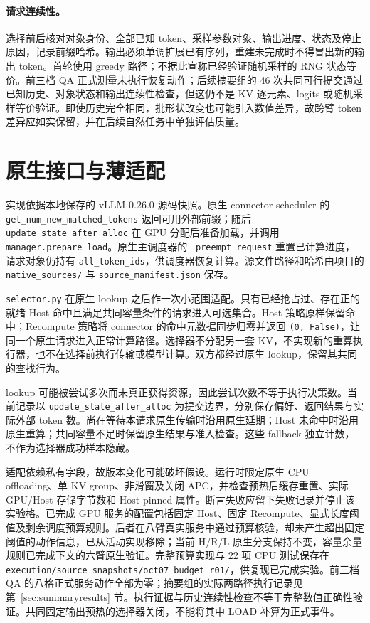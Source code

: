 \documentclass[UTF8,fontset=fandol,a4paper,10pt]{ctexart}
\newcommand{\code}[1]{\nolinkurl{#1}}
\begin{document}
\paragraph{请求连续性。}
选择前后核对对象身份、全部已知 token、采样参数对象、输出进度、状态及停止原因，记录前缀哈希。输出必须单调扩展已有序列，重建未完成时不得冒出新的输出 token。首轮使用 greedy 路径；不据此宣称已经验证随机采样的 RNG 状态等价。前三档 QA 正式测量未执行恢复动作；后续摘要组的 46 次共同可行提交通过已知历史、对象状态和输出连续性检查，但这仍不是 KV 逐元素、logits 或随机采样等价验证。即使历史完全相同，批形状改变也可能引入数值差异，故跨臂 token 差异应如实保留，并在后续自然任务中单独评估质量。

\section{原生接口与薄适配}
\label{sec:implementation}
实现依据本地保存的 vLLM 0.26.0 源码快照。原生 connector scheduler 的
\code{get_num_new_matched_tokens} 返回可用外部前缀；随后
\code{update_state_after_alloc} 在 GPU 分配后准备加载，并调用
\code{manager.prepare_load}。原生主调度器的
\code{_preempt_request} 重置已计算进度，请求对象仍持有
\code{all_token_ids}，供调度器恢复计算。源文件路径和哈希由项目的
\code{native_sources/} 与 \code{source_manifest.json} 保存。

\code{selector.py} 在原生 lookup 之后作一次小范围适配。只有已经抢占过、存在正的就绪 Host 命中且满足共同容量条件的请求进入可选集合。Host 策略原样保留命中；Recompute 策略将 connector 的命中元数据同步归零并返回 \code{(0, False)}，让同一个原生请求进入正常计算路径。选择器不分配另一套 KV，不实现新的重算执行器，也不在选择前执行传输或模型计算。双方都经过原生 lookup，保留其共同的查找行为。

lookup 可能被尝试多次而未真正获得资源，因此尝试次数不等于执行决策数。当前记录以
\code{update_state_after_alloc} 为提交边界，分别保存偏好、返回结果与实际外部 token 数。尚在等待本请求原生传输时沿用原生延期；Host 未命中时沿用原生重算；共同容量不足时保留原生结果与准入检查。这些 fallback 独立计数，不作为选择器成功样本隐藏。

适配依赖私有字段，故版本变化可能破坏假设。运行时限定原生 CPU offloading、单 KV group、非滑窗及关闭 APC，并检查预热后缓存重置、实际 GPU/Host 存储字节数和 Host pinned 属性。断言失败应留下失败记录并停止该实验格。已完成 GPU 服务的配置包括固定 Host、固定 Recompute、显式长度阈值及剩余调度预算规则。后者在八臂真实服务中通过预算核验，却未产生超出固定阈值的动作信息，已从活动实现移除；当前 H/R/L 原生分支保持不变，容量余量规则已完成下文的六臂原生验证。完整预算实现与 22 项 CPU 测试保存在\code{execution/source_snapshots/oct07_budget_r01/}，供复现已完成实验。前三档 QA 的八格正式服务动作全部为零；摘要组的实际两路径执行记录见第~\ref{sec:summaryresults} 节。执行证据与历史连续性检查不等于完整数值正确性验证。共同固定输出预热的选择器关闭，不能将其中 LOAD 补算为正式事件。
\end{document}
